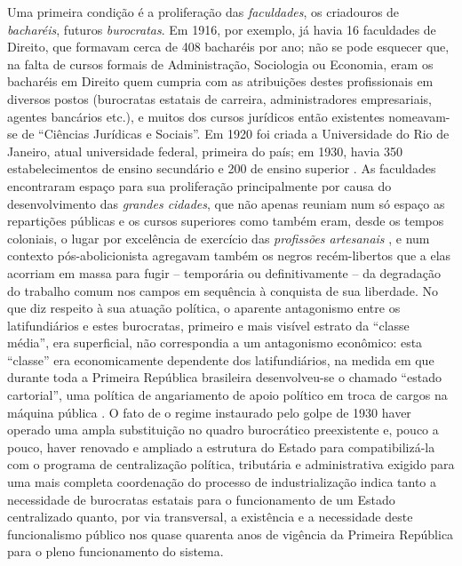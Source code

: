 Uma primeira condição é a proliferação das \textit{faculdades}, os criadouros de \textit{bacharéis}, futuros \textit{burocratas}. Em 1916, por exemplo, já havia 16 faculdades de Direito, que formavam cerca de 408 bacharéis por ano; não se pode esquecer que, na falta de cursos formais de Administração, Sociologia ou Economia, eram os bacharéis em Direito quem cumpria com as atribuições destes profissionais em diversos postos (burocratas estatais de carreira, administradores empresariais, agentes bancários etc.), e muitos dos cursos jurídicos então existentes nomeavam-se de ``Ciências Jurídicas e Sociais''. Em 1920 foi criada a Universidade do Rio de Janeiro, atual universidade federal, primeira do país; em 1930, havia 350 estabelecimentos de ensino secundário e 200 de ensino superior \cite[p.~17]{pinheiro_clamed_1977}. As faculdades encontraram espaço para sua proliferação principalmente por causa do desenvolvimento das \textit{grandes cidades}, que não apenas reuniam num só espaço as repartições públicas e os cursos superiores como também eram, desde os tempos coloniais, o lugar por excelência de exercício das \textit{profissões artesanais} \cite{REIS2012}, e num contexto pós-abolicionista agregavam também os negros recém-libertos que a elas acorriam em massa para fugir -- temporária ou definitivamente -- da degradação do trabalho comum nos campos em sequência à conquista de sua liberdade\cite{AZEVEDO2004, bacelar_negrosalvador_1994}. No que diz respeito à sua atuação política, o aparente antagonismo entre os latifundiários e estes burocratas, primeiro e mais visível estrato da ``classe média'', era superficial, não correspondia a um antagonismo econômico: esta ``classe'' era economicamente dependente dos latifundiários, na medida em que durante toda a Primeira República brasileira desenvolveu-se o chamado ``estado cartorial'', uma política de angariamento de apoio político em troca de cargos na máquina pública \cite[p.~20]{pinheiro_clamed_1977}. O fato de o regime instaurado pelo golpe de 1930 haver operado uma ampla substituição no quadro burocrático preexistente e, pouco a pouco, haver renovado e ampliado a estrutura do Estado para compatibilizá-la com o programa de centralização política, tributária e administrativa exigido para uma mais completa coordenação do processo de industrialização \cite{araujo_dasp_2017} indica tanto a necessidade de burocratas estatais para o funcionamento de um Estado centralizado quanto, por via transversal, a existência e a necessidade deste funcionalismo público nos quase quarenta anos de vigência da Primeira República para o pleno funcionamento do sistema.

